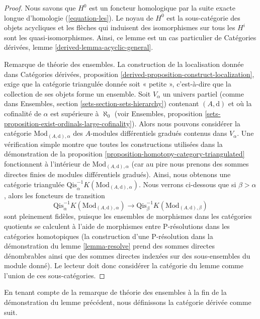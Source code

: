 \begin{proof}
Nous savons que $H^0$ est un foncteur homologique par la suite
exacte longue d'homologie (\ref{equation-les}). Le
noyau de $H^0$ est la sous-catégorie des objets acycliques et les
flèches qui induisent des isomorphismes sur tous les $H^i$ sont
les quasi-isomorphismes. Ainsi, ce lemme est un cas particulier
de Catégories dérivées, lemme \ref{derived-lemma-acyclic-general}.

\medskip\noindent
Remarque de théorie des ensembles. La construction de la localisation
donnée dans Catégories dérivées,
proposition
\ref{derived-proposition-construct-localization}, exige que la catégorie triangulée donnée soit « petite », c'est-à-dire
que la collection de ses objets forme un ensemble. Soit $V_\alpha$ un
univers partiel (comme dans Ensembles, section \ref{sets-section-sets-hierarchy})
contenant $(A, \text{d})$ et où la cofinalité de $\alpha$ est supérieure à
$\aleph_0$ (voir Ensembles,
proposition \ref{sets-proposition-exist-ordinals-large-cofinality}). Alors nous pouvons
considérer la catégorie $\text{Mod}_{(A, \text{d}), \alpha}$ des $A$-modules
différentiels gradués contenus dans $V_\alpha$. Une vérification simple
montre que toutes les constructions utilisées dans la démonstration de la
proposition \ref{proposition-homotopy-category-triangulated} fonctionnent à
l'intérieur de $\text{Mod}_{(A, \text{d}), \alpha}$ (car au pire
nous prenons des sommes directes finies de modules différentiels gradués). Ainsi, nous
obtenons une catégorie triangulée
$\text{Qis}_\alpha^{-1}K(\text{Mod}_{(A, \text{d}), \alpha})$. Nous verrons
ci-dessous que si $\beta > \alpha$, alors les foncteurs de transition
$$
\text{Qis}_\alpha^{-1}K(\text{Mod}_{(A, \text{d}), \alpha})
\longrightarrow
\text{Qis}_\beta^{-1}K(\text{Mod}_{(A, \text{d}), \beta})
$$
sont pleinement fidèles, puisque les ensembles de morphismes dans les
catégories quotients se calculent à l'aide de morphismes entre P-résolutions dans les
catégories homotopiques (la construction d'une P-résolution dans la démonstration du lemme
\ref{lemma-resolve} prend des sommes directes dénombrables ainsi que des sommes directes
indexées sur des sous-ensembles du module donné). Le lecteur doit donc considérer la
catégorie du lemme comme l'union de ces sous-catégories.
\end{proof}

\noindent
En tenant compte de la remarque de théorie des ensembles à la fin de la
démonstration du lemme précédent, nous définissons la catégorie dérivée comme suit.

